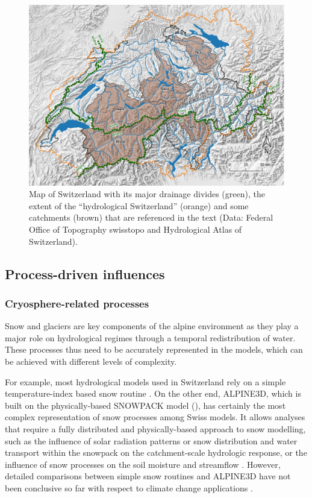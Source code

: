 \documentclass[10pt,a4paper]{article}
\begin{document}
\begin{figure}[htb]
	\begin{center}
		\includegraphics[width=0.95\columnwidth]{figures/map}
		\caption{{Map of Switzerland with its major drainage divides (green), the extent of the ``hydrological Switzerland'' (orange) and some catchments (brown) that are referenced in the text (Data: Federal Office of Topography swisstopo and Hydrological Atlas of Switzerland). \label{fig:map}
		}}
	\end{center}
\end{figure}


\subsection{Process-driven influences}
\label{sec:application:processes}


\subsubsection{Cryosphere-related processes}
\label{sec:application:cryosphere}

Snow and glaciers are key components of the alpine environment as they play a major role on hydrological regimes through a temporal redistribution of water. These processes thus need to be accurately represented in the models, which can be achieved with different levels of complexity. 

For example, most hydrological models used in Switzerland rely on a simple temperature-index based snow routine \citep[see for example][]{Jenicek2018}. On the other end, ALPINE3D, which is built on the physically-based SNOWPACK model (\citealt{Bartelt2002, Lehning2002a, Lehning2002b}), has certainly the most complex representation of snow processes among Swiss models. It allows analyses that require a fully distributed and physically-based approach to snow modelling, such as the influence of solar radiation patterns \citep{Comola2015a} or snow distribution and water transport within the snowpack \citep{Brauchli2017} on the catchment-scale hydrologic response, or the influence of snow processes on the soil moisture and streamflow \citep{Wever2017}. However, detailed comparisons between simple snow routines and ALPINE3D have not been conclusive so far with respect to climate change applications \citep{Kobierska2011, Shakoor2018}.
\end{document}
